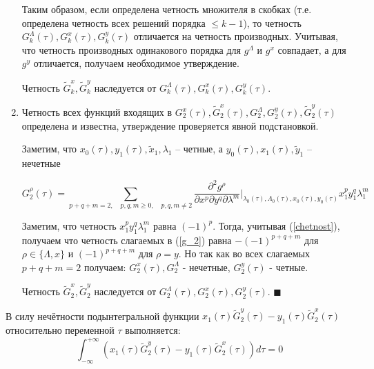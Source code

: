 \begin{enumerate}
Таким образом, если определена четность множителя в скобках (т.е. определена четность всех решений порядка $\le k-1$), то четность $G_k^\Lambda(\tau),G_k^x(\tau),G_k^y(\tau)$ отличается на четность производных.
Учитывая, что четность производных одинакового порядка для $g^\Lambda$ и $g^x$ совпадает, а для $g^y$ отличается, получаем необходимое утверждение.

Четность $\tilde G_k^x, \tilde G_k^y$ наследуется от $G_k^\Lambda(\tau),G_k^x(\tau),G_k^y(\tau)$.

\item Четность всех функций входящих в $G_2^x(\tau), \tilde G_2^x(\tau), G_2^\Lambda, G_2^y(\tau), \tilde G_2^y(\tau)$ определена и известна, утверждение проверяется явной подстановкой.

Заметим, что $x_0(\tau), y_1(\tau), \tilde x_1, \lambda_1$ -- четные, а $y_0(\tau), x_1(\tau), \tilde y_1$ -- нечетные

\begin{equation}
G_2^\rho(\tau) = \sum_{p+q+m=2,\quad p,q,m \ge 0, \quad p,q,m \neq 2} \frac{\partial^{2}g^\rho}{\partial x^p \partial y^q \partial \lambda^m}\bigg|_{\lambda_0(\tau),\Lambda_0(\tau),x_0(\tau),y_0(\tau)} x_1^p y_1^q \lambda_1^m
\label{g_2}
\end{equation}

Заметим, что четность $x_1^p y_1^q \lambda_1^m$ равна $(-1)^p$. Тогда, учитывая (\ref{chetnost}), получаем что четность слагаемых в (\ref{g_2}) равна $-(-1)^{p+q+m}$ для $\rho \in \{ \Lambda, x \}$ и $(-1)^{p+q+m}$ для $\rho = y$. Но так как во всех слагаемых $p+q+m=2$ получаем:
$G_2^x(\tau), G_2^\Lambda$ - нечетные, $G_2^y(\tau)$ - четные.

Четность $\tilde G_2^x, \tilde G_2^y$ наследуется от $G_2^\Lambda(\tau),G_2^x(\tau),G_2^y(\tau)$.
$\blacksquare$
\end{enumerate}
\begin{consequence}
В силу нечётности подынтегральной функции $x_1(\tau) \tilde G_2^y(\tau) - y_1(\tau) \tilde G_2^x(\tau)$ относительно переменной $\tau$ выполняется:
$$\int_{-\infty}^{+\infty} \left( x_1(\tau) \tilde G_2^y(\tau) - y_1(\tau) \tilde G_2^x(\tau) \right) d \tau = 0$$






\end{consequence}
